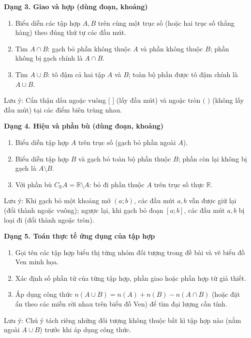 \textbf{Dạng 3. Giao và hợp (dùng đoạn, khoảng)}
\begin{enumerate}
\item Biểu diễn các tập hợp $A, B$ trên cùng một trục số (hoặc hai trục số thẳng hàng) theo đúng thứ tự các đầu mút.
\item Tìm $A \cap B$: gạch bỏ phần không thuộc $A$ và phần không thuộc $B$; phần không bị gạch chính là $A \cap B$.
\item Tìm $A \cup B$: tô đậm cả hai tập $A$ và $B$; toàn bộ phần được tô đậm chính là $A \cup B$.
\end{enumerate}
Lưu ý: Cẩn thận dấu ngoặc vuông $[$ $]$ (lấy đầu mút) và ngoặc tròn $($ $)$ (không lấy đầu mút) tại các điểm biên trùng nhau.

\textbf{Dạng 4. Hiệu và phần bù (dùng đoạn, khoảng)}
\begin{enumerate}
\item Biểu diễn tập hợp $A$ trên trục số (gạch bỏ phần ngoài $A$).
\item Biểu diễn tập hợp $B$ và gạch bỏ toàn bộ phần thuộc $B$; phần còn lại không bị gạch là $A \setminus B$.
\item Với phần bù $C_{\mathbb{R}} A = \mathbb{R} \setminus A$: bỏ đi phần thuộc $A$ trên trục số thực $\mathbb{R}$.
\end{enumerate}
Lưu ý: Khi gạch bỏ một khoảng mở $(a; b)$, các đầu mút $a, b$ vẫn được giữ lại (đổi thành ngoặc vuông); ngược lại, khi gạch bỏ đoạn $[a; b]$, các đầu mút $a, b$ bị loại đi (đổi thành ngoặc tròn).

\textbf{Dạng 5. Toán thực tế ứng dụng của tập hợp}
\begin{enumerate}
\item Gọi tên các tập hợp biểu thị từng nhóm đối tượng trong đề bài và vẽ biểu đồ Ven minh họa.
\item Xác định số phần tử của từng tập hợp, phần giao hoặc phần hợp từ giả thiết.
\item Áp dụng công thức $n(A \cup B) = n(A) + n(B) - n(A \cap B)$ (hoặc đặt ẩn theo các miền rời nhau trên biểu đồ Ven) để tìm đại lượng cần tính.
\end{enumerate}
Lưu ý: Chú ý tách riêng những đối tượng không thuộc bất kì tập hợp nào (nằm ngoài $A \cup B$) trước khi áp dụng công thức.
